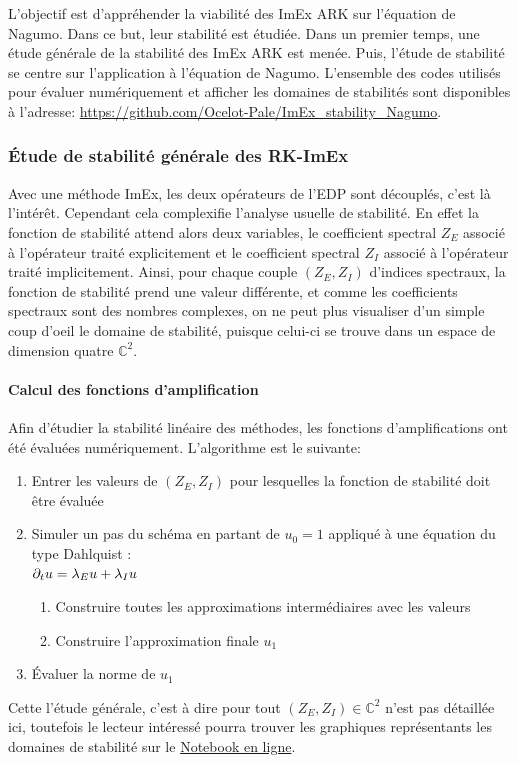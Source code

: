 \label{par:contrib1:stab}
L'objectif est d'appréhender la viabilité des ImEx ARK sur l'équation de Nagumo. Dans ce but, leur stabilité est étudiée.
Dans un premier temps, une étude générale de la stabilité des ImEx ARK est menée.
Puis, l'étude de stabilité se centre sur l'application à l'équation de Nagumo. L'ensemble des codes utilisés pour évaluer numériquement et afficher les domaines de stabilités
sont disponibles à l'adresse: \href{https://github.com/Ocelot-Pale/ImEx_stability_Nagumo}{https://github.com/Ocelot-Pale/ImEx\_stability\_Nagumo}.



\subsubsection{Étude de stabilité générale des RK-ImEx}
    Avec une méthode ImEx, les deux opérateurs de l'EDP sont découplés, c'est là l'intérêt.
    Cependant cela complexifie l'analyse usuelle de stabilité. 
    En effet la fonction de stabilité attend alors deux variables, 
    le coefficient spectral $Z_E$ associé à l'opérateur traité explicitement et
    le coefficient spectral $Z_I$ associé à l'opérateur traité implicitement.
    Ainsi, pour chaque couple $(Z_E,Z_I)$ d'indices spectraux, la fonction de stabilité prend une valeur différente, et comme les coefficients spectraux sont des nombres complexes, 
    on ne peut plus visualiser d'un simple coup d'oeil le domaine de stabilité, puisque celui-ci se trouve dans un espace de dimension quatre $\mathbb{C}^2$.
    \paragraph{Calcul des fonctions d'amplification }
    Afin d'étudier la stabilité linéaire des méthodes, les fonctions d'amplifications ont été évaluées numériquement.
    L'algorithme est le suivante:
    \begin{enumerate}
        \item Entrer les valeurs de $(Z_E,Z_I)$ pour lesquelles la fonction de stabilité doit être évaluée
        \item Simuler un pas du schéma en partant de $u_0 = 1$ appliqué à une équation du type Dahlquist :\\$\partial_t u = \lambda_E u + \lambda_I u$
        \begin{enumerate}
            \item Construire toutes les approximations intermédiaires avec les valeurs 
            \item Construire l'approximation finale $u_1$
        \end{enumerate}
        \item Évaluer la norme de $u_1$
    \end{enumerate}
    Cette l'étude générale, c'est à dire pour tout $(Z_E,Z_I) \in \mathbb{C}^2$ n'est pas détaillée ici, toutefois
    le lecteur intéressé pourra trouver les graphiques représentants les domaines de stabilité sur le \href{https://github.com/Ocelot-Pale/ImEx_stability_Nagumo}{Notebook en ligne}.


